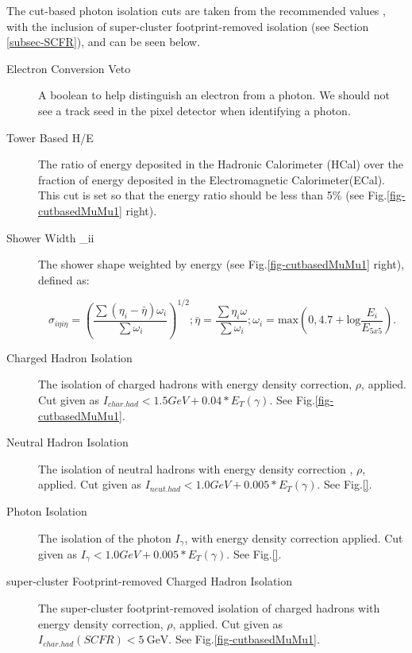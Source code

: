 The cut-based photon isolation cuts are taken from the recommended values \cite{CutBasedIsolation2012}, with the inclusion of super-cluster footprint-removed isolation (see Section \ref{subsec-SCFR}), and can be seen below.

\begin{description}

\item[Electron Conversion Veto] A boolean to help distinguish an electron from a photon. We should not see a track seed in the pixel detector when identifying a photon. 

\item[Tower Based H/E] The ratio of energy deposited in the Hadronic Calorimeter (HCal) over the fraction of energy deposited in the Electromagnetic Calorimeter(ECal). This cut is
set so that the energy ratio should be less than 5\% (see Fig.\ref{fig-cutbasedMuMu1} right).

\item[Shower Width \sigma_{i\eta i\eta}] The shower shape weighted by energy (see Fig.\ref{fig-cutbasedMuMu1} right), defined as: 

\begin{equation}
\sigma_{i\eta i\eta} = \left(\frac{\sum(\eta_i - \bar{\eta})\omega_i}{\sum\omega_i}\right)^{1/2};  \bar{\eta} = \frac{\sum\eta_i\omega}{\sum\omega_i};  \omega_i = \text{max}\left(0, 4.7 +
\text{log}\frac{E_i}{E_{5x5}}\right).
\end{equation}

\item[Charged Hadron Isolation] The isolation of charged hadrons with energy density correction, $\rho$, applied. Cut given as $I_{char.had} < 1.5 GeV + 0.04*E_T(\gamma)$. See Fig.\ref{fig-cutbasedMuMu1}.

\item[Neutral Hadron Isolation] The isolation of neutral hadrons with energy density correction , $\rho$, applied. Cut given as $I_{neut.had} < 1.0 GeV + 0.005*E_T(\gamma)$. See Fig.\ref{}.

\item[Photon Isolation] The isolation of the photon $I_{\gamma}$, with energy density correction applied. Cut given as $I_{\gamma} < 1.0 GeV + 0.005*E_T(\gamma)$. See
Fig.\ref{}.

\item[super-cluster Footprint-removed Charged Hadron Isolation] The super-cluster footprint-removed isolation of charged hadrons with energy density correction, $\rho$, applied.
Cut given as $I_{char.had}(SCFR) < 5 \ \text{GeV} $. See Fig.\ref{fig-cutbasedMuMu1}.


\end{description}
